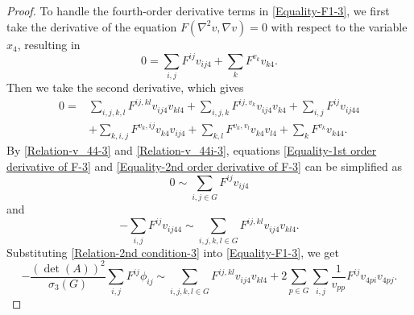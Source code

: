 \documentclass[11pt]{amsart}
\numberwithin{theorem}{section}
\numberwithin{equation}{section}
\begin{document}
\begin{proof}
To handle the fourth-order derivative terms in \eqref{Equality-F1-3}, we first take the derivative of the equation $F(\nabla^2v, \nabla v)=0$ with respect to the variable $x_4$, resulting in
\begin{equation}\label{Equality-1st order derivative of F-3}
0=\sum_{i, j}F^{ij}v_{ij4}+\sum_kF^{v_k}v_{k4}.
\end{equation}
Then we take the second derivative, which gives
\begin{equation}\label{Equality-2nd order derivative of F-3}
\begin{aligned}
0=&\sum_{i,j,k,l}F^{ij,kl}v_{ij4}v_{kl4}+\sum_{i,j,k}F^{ij,v_k}v_{ij4}v_{k4}+\sum_{i,j}F^{ij}v_{ij44}\\
&+\sum_{k,i,j}F^{v_k,ij}v_{k4}v_{ij4}+\sum_{k,l}F^{v_k,v_l}v_{k4}v_{l4}+\sum_kF^{v_k}v_{k44}.
\end{aligned}
\end{equation}
By \eqref{Relation-v_44-3} and \eqref{Relation-v_44i-3}, equations \eqref{Equality-1st order derivative of F-3} and \eqref{Equality-2nd order derivative of F-3} can be simplified as
\begin{equation}\label{Relation-1st condition-3}
0\sim\sum_{i, j\in G}F^{ij}v_{ij4}
\end{equation}
and
\begin{equation}\label{Relation-2nd condition-3}
-\sum_{i, j}F^{ij}v_{ij44}\sim\sum_{i, j, k, l\in G}F^{ij, kl}v_{ij4}v_{kl4}.
\end{equation}
Substituting \eqref{Relation-2nd condition-3} into \eqref{Equality-F1-3}, we get
\begin{equation}\label{Equality-F2-3}
-\frac{(\det(A))^2}{\sigma_3(G)}\sum_{i, j}F^{ij}\phi_{ij}\sim\sum_{i, j, k, l\in G}F^{ij, kl}v_{ij4}v_{kl4}+2\sum_{p\in G}\sum_{i, j}\frac{1}{v_{pp}}F^{ij}v_{4pi}v_{4pj}.
\end{equation}
 

\end{proof}
\end{document}

